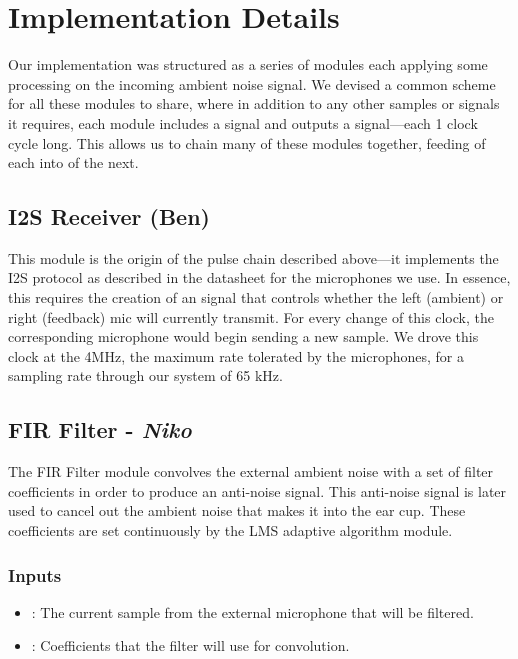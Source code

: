 \documentclass{fpgairpods}
\begin{document}
\section{Implementation Details}
Our implementation was structured as a series of modules each applying some processing on the incoming ambient noise signal. We devised a common scheme for all these modules to share, where in addition to any other samples or signals it requires, each module includes a  signal and outputs a  signal---each 1 clock cycle long. This allows us to chain many of these modules together, feeding  of each into  of the next.

\subsection{I2S Receiver (Ben)}
This module is the origin of the  pulse chain described above---it implements the I2S protocol as described in the datasheet for the microphones we use\autocite{mic_datasheet}. In essence, this requires the creation of an  signal that controls whether the left (ambient) or right (feedback) mic will currently transmit. For every change of this clock, the corresponding microphone would begin sending a new sample. We drove this clock at the 4MHz, the maximum rate tolerated by the microphones, for a sampling rate through our system of 65 kHz.

\subsection{FIR Filter - \textit{Niko}}
The FIR Filter module convolves the external ambient noise with a set of filter coefficients in order to produce an anti-noise signal. This anti-noise signal is later used to cancel out the ambient noise that makes it into the ear cup. These coefficients are set continuously by the LMS adaptive algorithm module.
\subsubsection{Inputs}
\begin{itemize}
    \item {}: The current sample from the external microphone that will be filtered.
    \item {}: Coefficients that the filter will use for convolution.
\end{itemize}
\end{document}
